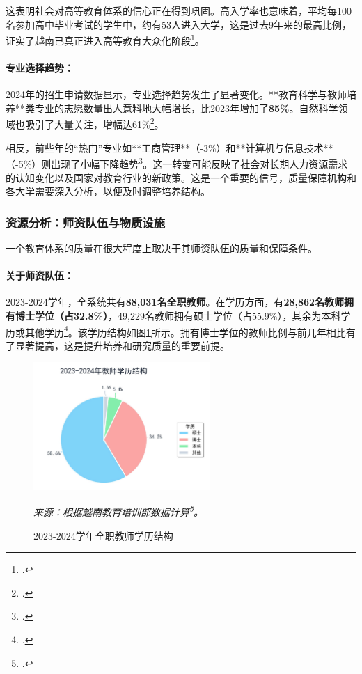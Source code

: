 这表明社会对高等教育体系的信心正在得到巩固。高入学率也意味着，平均每100名参加高中毕业考试的学生中，约有53人进入大学，这是过去9年来的最高比例，证实了越南已真正进入高等教育大众化阶段\footcite{stat_ty_le_vao_dh_2023}。

\paragraph{专业选择趋势：}
2024年的招生申请数据显示，专业选择趋势发生了显著变化。**教育科学与教师培养**类专业的志愿数量出人意料地大幅增长，比2023年增加了\textbf{85\%}。自然科学领域也吸引了大量关注，增幅达61\%\footcite{stat_tuyen_sinh_2024_so_lieu}。

相反，前些年的“热门”专业如**工商管理**（-3\%）和**计算机与信息技术**（-5\%）则出现了小幅下降趋势\footcite{stat_tuyen_sinh_2024_so_lieu}。这一转变可能反映了社会对长期人力资源需求的认知变化以及国家对教育行业的新政策。这是一个重要的信号，质量保障机构和各大学需要深入分析，以便及时调整培养结构。

\subsubsection{资源分析：师资队伍与物质设施}

一个教育体系的质量在很大程度上取决于其师资队伍的质量和保障条件。

\paragraph{关于师资队伍：}
2023-2024学年，全系统共有\textbf{88,031名全职教师}。在学历方面，有\textbf{28,862名教师拥有博士学位（占32.8\%）}，49,229名教师拥有硕士学位（占55.9\%），其余为本科学历或其他学历\footcite{stat_moet_2024}。该学历结构如图\ref{fig:co_cau_giang_vien}所示。拥有博士学位的教师比例与前几年相比有了显著提高，这是提升培养和研究质量的重要前提。


\begin{figure}[h!]
    \centering
    \includegraphics[width=0.6\textwidth]{image/co_cau_trinh_do_giang_vien_2023_2024.jpg}
    \caption{2023-2024学年全职教师学历结构}
    \label{fig:co_cau_giang_vien}
    \vspace{0.2cm}
    \footnotesize{\textit{来源：根据越南教育培训部数据计算\footcite{stat_moet_2024}。}}
\end{figure}

